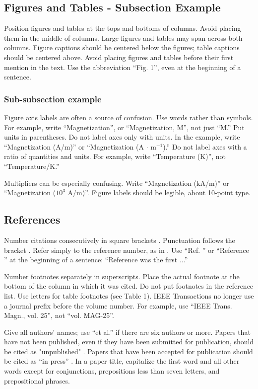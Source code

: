 \subsection{Figures and Tables - Subsection Example}

Position figures and tables at the tops and bottoms of columns. Avoid
placing them in the middle of columns. Large figures and tables may span
across both columns. Figure captions should be centered below the figures;
table captions should be centered above. Avoid placing figures and tables
before their first mention in the text. Use the abbreviation ``Fig. 1'',
even at the beginning of a sentence.

\subsubsection{Sub-subsection example}
Figure axis labels are often a source of confusion. Use words rather than
symbols. For example, write ``Magnetization'', or ``Magnetization, M'',
not just ``M.''  Put units in parentheses. Do not label axes only with
units. In the example, write ``Magnetization (A/m)'' or ``Magnetization (A
$\cdot$ m$^{-1}$).'' Do not label axes with a ratio of quantities and
units. For example, write ``Temperature (K)'', not ``Temperature/K.''

Multipliers can be especially confusing. Write ``Magnetization (kA/m)'' or
``Magnetization ($10^{3}$ A/m)''. Figure labels should be legible, about
10-point type.


\subsection{References}

Number citations consecutively in square brackets \cite{eason}.
Punctuation follows the bracket \cite{maxwell}. Refer simply to the
reference number, as in \cite{jacobs}. Use ``Ref. \cite{jacobs}'' or
``Reference \cite{jacobs}'' at the beginning of a sentence: ``Reference
\cite{jacobs} was the first ...''

Number footnotes separately in superscripts. Place the actual footnote at
the bottom of the column in which it was cited. Do not put footnotes in
the reference list. Use letters for table footnotes (see Table 1). IEEE
Transactions no longer use a journal prefix before the volume number. For
example, use ``IEEE Trans. Magn., vol. 25'', not ``vol. MAG-25''.

Give all authors' names; use ``et al.'' if there are six authors or more.
Papers that have not been published, even if they have been submitted for
publication, should be cited as "unpublished" \cite{elissa}. Papers that
have been accepted for publication should be cited as ``in press''
\cite{nicole}. In a paper title, capitalize the first word and all other
words except for conjunctions, prepositions less than seven letters, and
prepositional phrases.

